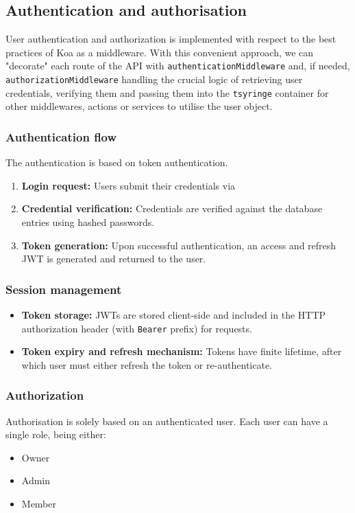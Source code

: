 \subsection{Authentication and authorisation}
User authentication and authorization is implemented with respect to the best practices of Koa as a middleware.
With this convenient approach, we can "decorate" each route of the API with \texttt{authenticationMiddleware} and, if needed, \texttt{authorizationMiddleware} handling the crucial logic of retrieving user credentials, verifying them and passing them into the \texttt{tsyringe} container for other middlewares, actions or services to utilise the user object.

\subsubsection{Authentication flow}
The authentication is based on token authentication.
\begin{enumerate}
    \item \textbf{Login request:} Users submit their credentials via 
    \item \textbf{Credential verification:} Credentials are verified against the database entries using hashed passwords.
    \item \textbf{Token generation:} Upon successful authentication, an access and refresh \ac{JWT} is generated and returned to the user.
\end{enumerate}

\subsubsection{Session management}
\begin{itemize}
    \item \textbf{Token storage:} \ac{JWT}s are stored client-side and included in the HTTP authorization header (with \texttt{Bearer} prefix) for requests.
    \item \textbf{Token expiry and refresh mechanism:} Tokens have finite lifetime, after which user must either refresh the token or re-authenticate.
\end{itemize}

\subsubsection{Authorization}
Authorisation is solely based on an authenticated user. 
Each user can have a single role, being either:
\begin{itemize}
    \item Owner
    \item Admin
    \item Member
\end{itemize}

